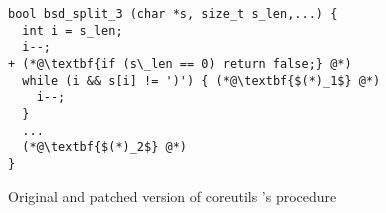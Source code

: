\begin{figure}
\centering
\begin{lstlisting}
bool bsd_split_3 (char *s, size_t s_len,...) {
  int i = s_len;
  i--;
+ (*@\textbf{if (s\_len == 0) return false;} @*)
  while (i && s[i] != ')') { (*@\textbf{$(*)_1$} @*)
    i--;
  }
  ...
  (*@\textbf{$(*)_2$} @*)
}
\end{lstlisting}
%
\caption{Original and patched version of coreutils 's  procedure}
\end{figure} 